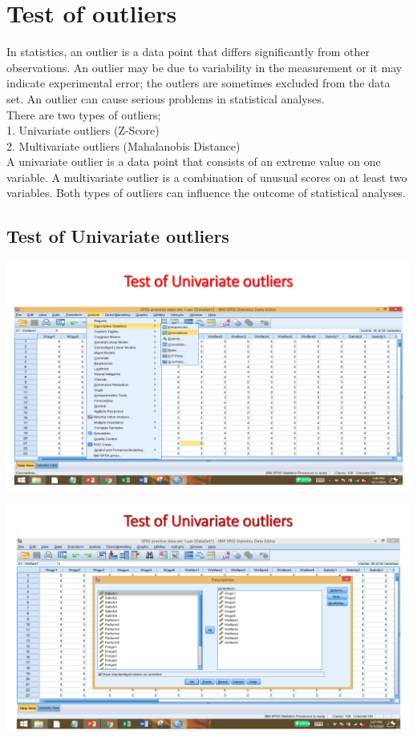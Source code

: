 \documentclass[
  letterpaper,
  DIV=11,
  numbers=noendperiod]{scrreprt}
\begin{document}

\chapter{Test of outliers}\label{test-of-outliers}

{In statistics, an outlier is a data point that differs significantly
from other observations. An outlier may be due to variability in the
measurement or it may indicate experimental error; the outlers are
sometimes excluded from the data set. An outlier can cause serious
problems in statistical analyses.}\\

{There are two types of outliers;}\\
{1. Univariate outliers (Z-Score)\\
2. Multivariate outliers (Mahalanobis Distance)}\\

{A univariate outlier is a data point that consists of an extreme value
on one variable. A multivariate outlier is a combination of unusual
scores on at least two variables. Both types of outliers can influence
the outcome of statistical analyses.}\\

\section{Test of Univariate outliers}\label{test-of-univariate-outliers}

\includegraphics{images/slides/img_Page_040.png}

\includegraphics{images/slides/img_Page_041.png}
\end{document}
